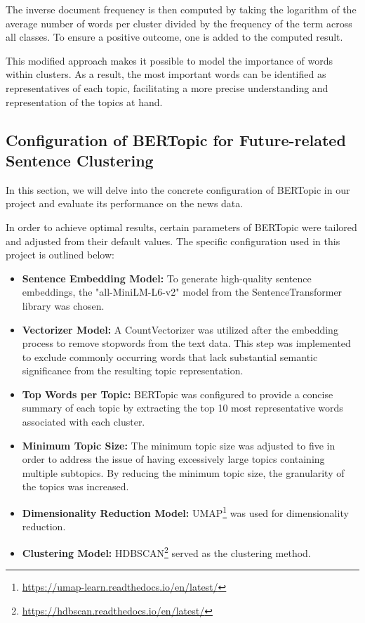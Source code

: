 \documentclass[a4paper,10pt]{report} %
\begin{document}
The inverse document frequency is then computed by taking the logarithm of the average number of words per cluster divided by the frequency of the term across all classes. To ensure a positive outcome, one is added to the computed result.

This modified approach makes it possible to model the importance of words within clusters. As a result, the most important words can be identified as representatives of each topic, facilitating a more precise understanding and representation of the topics at hand.

\subsection{Configuration of BERTopic for Future-related Sentence Clustering}
In this section, we will delve into the concrete configuration of BERTopic in our project and evaluate its performance on the news data.

In order to achieve optimal results, certain parameters of BERTopic were tailored and adjusted from their default values. The specific configuration used in this project is outlined below:

\begin{itemize}
    \item \textbf{Sentence Embedding Model:} To generate high-quality sentence embeddings, the "all-MiniLM-L6-v2" model from the SentenceTransformer library was chosen.

    \item \textbf{Vectorizer Model:} A CountVectorizer was utilized after the embedding process to remove stopwords from the text data. This step was implemented to exclude commonly occurring words that lack substantial semantic significance from the resulting topic representation.

    \item \textbf{Top Words per Topic:} BERTopic was configured to provide a concise summary of each topic by extracting the top 10 most representative words associated with each cluster.

    \item \textbf{Minimum Topic Size:} The minimum topic size was adjusted to five in order to address the issue of having excessively large topics containing multiple subtopics. By reducing the minimum topic size, the granularity of the topics was increased.

    \item \textbf{Dimensionality Reduction Model:} UMAP\footnote{\url{https://umap-learn.readthedocs.io/en/latest/}} was used for dimensionality reduction.

    \item \textbf{Clustering Model:} HDBSCAN\footnote{\url{https://hdbscan.readthedocs.io/en/latest/}} served as the clustering method.
\end{itemize}
\end{document}
